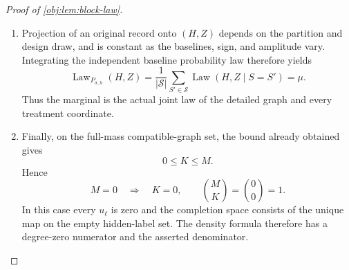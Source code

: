\begin{proof}[Proof of \cref{obj:lem:block-law}]
\begin{enumerate}
\item Projection of an original record onto \((H,Z)\) depends on the partition and design draw, and is constant as the baselines, sign, and amplitude vary. Integrating the independent baseline probability law therefore yields
\[
\operatorname{Law}_{P_{\sigma,h}}(H,Z)
=
\frac1{|\mathcal S|}
\sum_{S'\in\mathcal S}
\operatorname{Law}(H,Z\mid S=S')
=\mu.
\]
Thus the marginal is the actual joint law of the detailed graph and every treatment coordinate. %

\item Finally, on the full-mass compatible-graph set, the bound already obtained gives
\[
0\le K\le M.
\]
Hence
\[
M=0\quad\Longrightarrow\quad K=0,
\qquad
\binom{M}{K}=\binom00=1.
\]
In this case every \(u_\ell\) is zero and the completion space consists of the unique map on the empty hidden-label set. The density formula therefore has a degree-zero numerator and the asserted denominator. %
\end{enumerate}
\end{proof}
